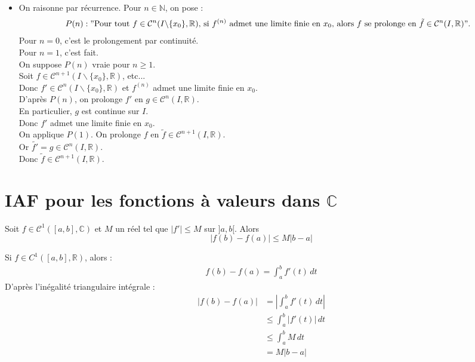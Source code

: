 \documentclass[../main.tex]{subfiles}
\begin{document}
\begin{itemize}
    \item On raisonne par récurrence. Pour $n \in \mathbb{N}$, on pose : 
    \begin{align*}
        P(n) : "\text{Pour tout $f \in \mathcal{C}^n(I\backslash \{x_0\}, \mathbb{R})$, si $f^{(n)}$ admet une limite finie en $x_0$, alors $f$ se prolonge en $\tilde{f} \in \mathcal{C}^n(I, \mathbb{R})$}".
    \end{align*}
    Pour $n = 0$, c'est le prolongement par continuité. \\
    Pour $n = 1$, c'est fait. \\
    On suppose $P(n)$ vraie pour $n \geq 1$. \\
    Soit $f\in \mathcal{C}^{n+1}(I\backslash \{x_0\}, \mathbb{R})$, etc... \\
    Donc $f'\in \mathcal{C}^n(I\backslash \{x_0\}, \mathbb{R})$ et $f^{(n)}$ admet une limite finie en $x_0$. \\
    D'après $P(n)$, on prolonge $f'$ en $g\in \mathcal{C}^n(I, \mathbb{R})$. \\
    En particulier, $g$ est continue sur $I$. \\
    Donc $f'$ admet une limite finie en $x_0$. \\
    On applique $P(1)$. On prolonge $f$ en $\tilde{f}\in \mathcal{C}^{n+1}(I, \mathbb{R})$. \\
    Or $\tilde{f'} = g \in \mathcal{C}^n(I, \mathbb{R})$. \\
    Donc $\tilde f \in \mathcal{C}^{n+1}(I, \mathbb{R})$. \\
\end{itemize}

\section{IAF pour les fonctions à valeurs dans $\mathbb{C}$}
\begin{tcolorbox}[title=Théorème 18.45, title filled=false, colframe=orange, colback=orange!10!white]
    Soit $f\in \mathcal{C}^1([a, b], \mathbb{C})$ et $M$ un réel tel que $|f'| \leq M$ sur $]a, b[$. Alors
    $$|f(b) - f(a)| \leq M|b - a|$$
\end{tcolorbox}

\noindent Si $f\in C^1([a, b], \mathbb{R})$, alors : 
\begin{align*}
    f(b) - f(a) = \int_{a}^{b} f'(t) \, dt
\end{align*}
D'après l'inégalité triangulaire intégrale :
\begin{align*}
    |f(b) - f(a)| &= \left| \int_{a}^{b} f'(t) \, dt \right| \\
    &\leq \int_{a}^{b} |f'(t)| \, dt \\
    &\leq \int_{a}^{b} M \, dt \\
    &= M|b - a|
\end{align*}
\end{document}
